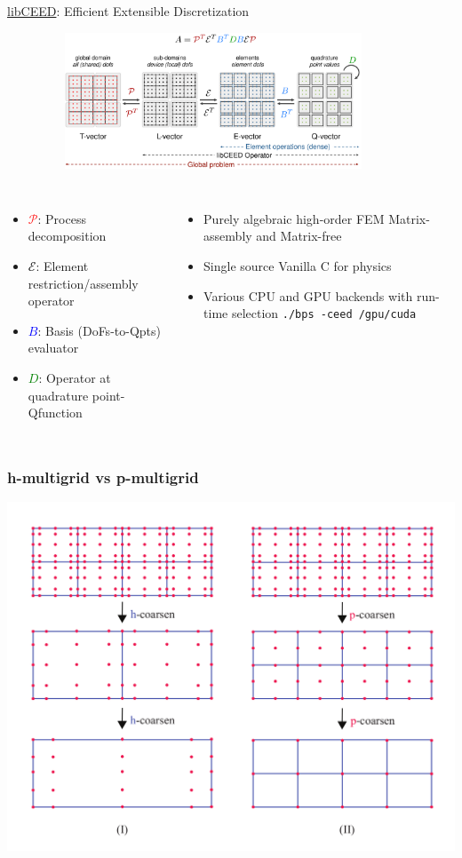 \documentclass[aspectratio=169,xcolor=dvipsnames]{beamer}
\begin{document}
\begin{frame}{\href{https://libceed.readthedocs.io}{libCEED}: Efficient Extensible Discretization}
\begin{figure}[t]
    \includegraphics[width=4in,height=1.6in]{figures/libCEEDAPI.png} %
\end{figure}

\begin{columns}[c] %

    {\footnotesize
    \begin{itemize}
    \item \textcolor{red}{$\mathcal{P}$}: Process decomposition
    \item \textcolor{black}{$\mathcal{E}$}: Element restriction/assembly operator
    \item \textcolor{blue}{${B}$}: Basis (DoFs-to-Qpts) evaluator
    \item  \textcolor{green}{${D}$}: Operator at quadrature point- Qfunction
    \end{itemize}
    }
    {\footnotesize
    \begin{itemize}
    \item Purely algebraic high-order FEM Matrix-assembly and Matrix-free
    \item Single source Vanilla C for physics
    \item Various CPU and GPU backends with run-time selection \texttt{./bps -ceed /gpu/cuda}
    \end{itemize}
    }
    \end{columns}

\end{frame}


\begin{frame}
    \frametitle{h-multigrid vs p-multigrid}
    \centering
    \includegraphics[height =0.8\textheight, width =0.55\linewidth]{figures/p-h-multigrid.png}

\end{frame}
\end{document}
